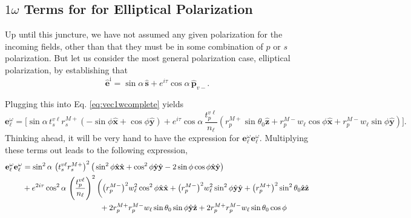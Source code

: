 \documentclass[aps,pra,10pt,amsmath,twocolumn,letterpaper]{revtex4-1}
\begin{document}
\subsection{\texorpdfstring{$1\omega$}{1w} Terms for for Elliptical
Polarization}

Up until this juncture, we have not assumed any given polarization for the
incoming fields, other than that they must be in some combination of $p$ or $s$
polarization. But let us consider the most general polarization case, elliptical
polarization, by establishing that \cite{byersPRB94}
\begin{equation}\label{eq:generalpol}
\hat{\mathbf{e}}^{\mathrm{i}}
= \sin\alpha\,\hat{\mathbf{s}}
+ e^{i\tau}\cos\alpha\,\hat{\mathbf{p}}_{v-}.
\end{equation}
\begin{widetext}
Plugging this into Eq. \eqref{eq:vec1wcomplete} yields
\begin{equation*}
\mathbf{e}^{\omega}_{\ell}
=
\Bigg[
\sin\alpha\,
t^{v\ell}_{s} r^{M+}_{s}
\left(- \sin\phi\hat{\mathbf{x}} + \cos\phi\hat{\mathbf{y}}\right)
+
e^{i\tau}\cos\alpha\,
\frac{t^{v\ell}_{p}}{n_{\ell}}
\left( 
  r^{M+}_{p}\sin\theta_{0}\hat{\mathbf{z}}
+ r^{M-}_{p}w_{\ell}\cos\phi\hat{\mathbf{x}}
+ r^{M-}_{p}w_{\ell}\sin\phi\hat{\mathbf{y}}
\right)
\Bigg].
\end{equation*}
Thinking ahead, it will be very hand to have the expression for
$\mathbf{e}^{\omega}_{\ell}\mathbf{e}^{\omega}_{\ell}$. Multiplying these terms
out leads to the following expression,
\begin{equation}\label{eq:nonmatrix}
\begin{split}
\mathbf{e}^{\omega}_{\ell}
\mathbf{e}^{\omega}_{\ell}
&=
\sin^{2}\alpha\,
\left(t^{v\ell}_{s}r^{M+}_{s}\right)^{2}
\big(
  \sin^{2}\phi\hat{\mathbf{x}}\hat{\mathbf{x}}
 + \cos^{2}\phi\hat{\mathbf{y}}\hat{\mathbf{y}}
 - 2\sin\phi\cos\phi\hat{\mathbf{x}}\hat{\mathbf{y}}
\big)\\
&+
e^{2i\tau} \cos^{2}\alpha\,
\left(\frac{t^{v\ell}_{p}}{n_{\ell}}\right)^{2}
\bigg(
\big(r^{M-}_{p}\big)^{2}w^{2}_{\ell}\cos^{2}\phi
    \hat{\mathbf{x}}\hat{\mathbf{x}}
  + \big(r^{M-}_{p}\big)^{2}w^{2}_{\ell}\sin^{2}\phi
    \hat{\mathbf{y}}\hat{\mathbf{y}}
  + \big(r^{M+}_{p}\big)^{2}\sin^{2}\theta_{0}
    \hat{\mathbf{z}}\hat{\mathbf{z}}\\
  &\hspace{3.5cm}+ 2r^{M+}_{p}r^{M-}_{p}w_{\ell}\sin\theta_{0}\sin\phi
    \hat{\mathbf{y}}\hat{\mathbf{z}}
  + 2r^{M+}_{p}r^{M-}_{p}w_{\ell}\sin\theta_{0}\cos\phi

\end{split}
\end{equation}
\end{widetext}
\end{document}
